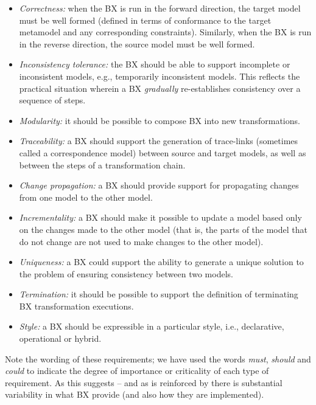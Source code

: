 \begin{itemize}
\item \textit{Correctness:} when the BX is run in the forward direction, the target model must be well formed (defined in terms of conformance to the target metamodel and any corresponding constraints). Similarly, when the BX is run in the reverse direction, the source model must be well formed.

\item \textit{Inconsistency tolerance:} the BX should be able to support incomplete or inconsistent models, e.g., temporarily inconsistent models. This reflects the practical situation wherein a BX \textit{gradually} re-establishes consistency over a sequence of steps.

\item \textit{Modularity:} it should be possible to compose BX into new transformations.

\item \textit{Traceability:} a BX should support the generation of trace-links (sometimes called a correspondence model) between source and target models, as well as between the steps of a transformation chain.

\item \textit{Change propagation:} a BX should provide support for propagating changes from one model to the other model. 

\item \textit{Incrementality:} a BX should make it possible to update a model based only on the changes made to the other model (that is, the parts of the model that do not change are not used to make changes to the other model). 

\item \textit{Uniqueness:} a BX could support the ability to generate a unique solution to the problem of ensuring consistency between two models.

\item \textit{Termination:} it should be possible to support the definition of terminating BX transformation executions.

\item \textit{Style:} a BX should be expressible in a particular style, i.e., declarative, operational or hybrid. 
\end{itemize}
Note the wording of these requirements; we have used the words \textit{must}, \textit{should} and \textit{could} to indicate the degree of importance or criticality of each type of requirement. As this suggests -- and as is reinforced by \cite{HidakaTCH16} there is substantial variability in what BX provide (and also how they are implemented).

